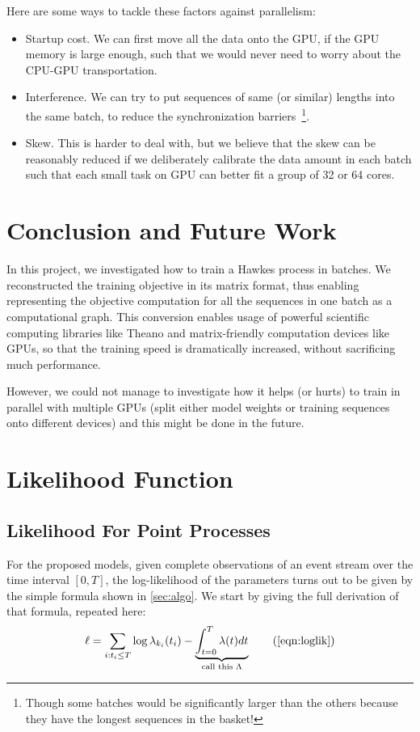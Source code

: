 \documentclass{article}
\begin{document}
Here are some ways to tackle these factors against parallelism:
\begin{itemize}
\item Startup cost. We can first move all the data onto the GPU, if the GPU memory is large enough, such that we would never need to worry about the CPU-GPU transportation. 
\item Interference. We can try to put sequences of same (or similar) lengths into the same batch, to reduce the synchronization barriers~\footnote{Though some batches would be significantly larger than the others because they have the longest sequences in the basket!}.
\item Skew. This is harder to deal with, but we believe that the skew can be reasonably reduced if we deliberately calibrate the data amount in each batch such that each small task on GPU can better fit a group of 32 or 64 cores. 
\end{itemize}

\section{Conclusion and Future Work}
In this project, we investigated how to train a Hawkes process in batches. We reconstructed the training objective in its matrix format, thus enabling representing the objective computation for all the sequences in one batch as a computational graph. This conversion enables usage of powerful scientific computing libraries like Theano and matrix-friendly computation devices like GPUs, so that the training speed is dramatically increased, without sacrificing much performance. 

However, we could not manage to investigate how it helps (or hurts) to train in parallel with multiple GPUs (split either model weights or training sequences onto different devices) and this might be done in the future. 


%
%


\clearpage
\appendix
\appendixpage

\section{Likelihood Function}
\label{sec:likelihood}

\subsection{Likelihood For Point Processes}\label{sec:lik}
For the proposed models, given complete observations of an event stream over the time interval $[0,T]$, the log-likelihood of the parameters turns out to be given by the simple formula shown in \cref{sec:algo}.  We start by giving the full derivation of that formula, repeated here:
\begin{equation*}
    \ell = \sum_{i: t_i\leq T} \log \lambda_{k_i}(t_i) - \underbrace{\int_{t=0}^{T} \lambda(t) dt}_{\text{call this }\Lambda} \tag{\ref{eqn:loglik}}
\end{equation*}
\end{document}

